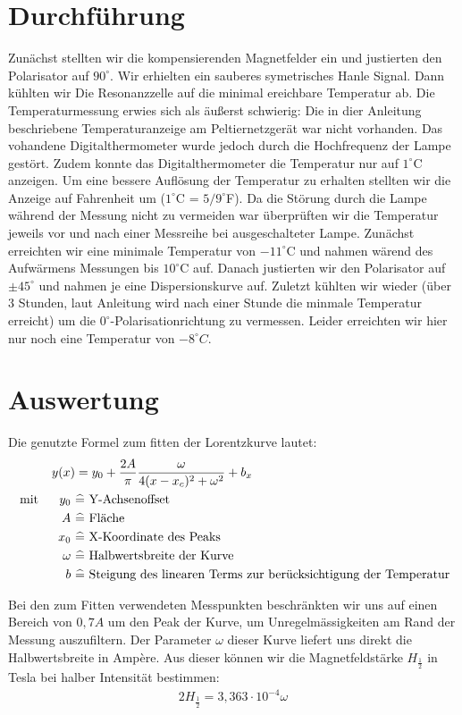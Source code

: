 \documentclass[12pt]{article}
\begin{document}
\section{Durchführung}
Zunächst stellten wir die kompensierenden Magnetfelder ein und justierten den Polarisator auf $90^\circ$. Wir erhielten
ein sauberes symetrisches Hanle Signal. Dann kühlten wir Die Resonanzzelle auf die minimal ereichbare Temperatur ab. Die
Temperaturmessung erwies sich als äußerst schwierig: Die in dier Anleitung beschriebene Temperaturanzeige am Peltiernetzgerät
war nicht vorhanden. Das vohandene Digitalthermometer wurde jedoch durch die Hochfrequenz der Lampe gestört. Zudem konnte das
Digitalthermometer die Temperatur nur auf $1^\circ$C anzeigen. Um eine bessere Auflösung der Temperatur zu erhalten stellten wir
die Anzeige auf Fahrenheit um ($1^\circ$C = $5/9^\circ$F). Da die Störung durch die Lampe während der Messung nicht zu vermeiden
war überprüften wir die Temperatur jeweils vor und nach einer Messreihe bei ausgeschalteter Lampe. Zunächst erreichten wir eine
minimale Temperatur von $-11^\circ$C und nahmen wärend des Aufwärmens Messungen bis $10^\circ$C auf. Danach justierten wir den
Polarisator auf $\pm 45^\circ$ und nahmen je eine Dispersionskurve auf. Zuletzt kühlten wir wieder (über 3 Stunden, laut Anleitung wird
nach einer Stunde die minmale Temperatur erreicht) um die $0^\circ$-Polarisationrichtung zu vermessen. Leider erreichten
wir hier nur noch eine Temperatur von $-8^\circ C$. 

\section{Auswertung}
Die genutzte Formel zum fitten der Lorentzkurve lautet:
\begin{align}
 y(x) &= y_0+\frac{2A}{\pi}\frac{\omega}{4(x-x_c)^2+\omega^2}+b_x \\
\notag \textnormal{ mit }~~~~ y_0~&\widehat{=} \textnormal{ Y-Achsenoffset } \\
\notag A~ &\widehat{=} \textnormal{ Fläche } \\
\notag x_0~ &\widehat{=} \textnormal{ X-Koordinate des Peaks } \\
\notag \omega~ &\widehat{=} \textnormal{ Halbwertsbreite der Kurve } \\
\notag b~ &\widehat{=} \textnormal{ Steigung des linearen Terms zur berücksichtigung der Temperatur}
\end{align}

Bei den zum Fitten verwendeten Messpunkten beschränkten wir uns auf einen Bereich von $0,7A$ um den Peak der Kurve, um
Unregelmässigkeiten am Rand der Messung auszufiltern. Der Parameter $\omega$ dieser Kurve liefert uns direkt die
Halbwertsbreite in Ampère. Aus dieser können wir die Magnetfeldstärke $H_{\frac{1}{2}}$ in Tesla bei halber Intensität bestimmen:
\begin{align}
 2H_{\frac{1}{2}}= 3,363\cdot 10^{-4} \omega
\end{align}
\end{document}
